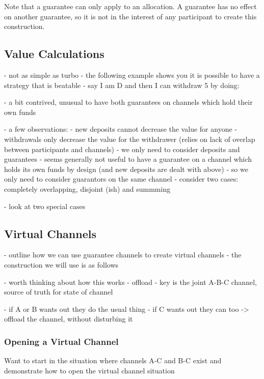 \documentclass{article}
\theoremstyle{definition}
\begin{document}
Note that a guarantee can only apply to an allocation. A guarantee has no effect on another guarantee, so it is not in the interest of any participant to create this construction.

\subsection{Value Calculations}

- not as simple as turbo
- the following example shows you it is possible to have a strategy that is beatable
- say I am D and then I can withdraw 5 by doing:

- a bit contrived, unusual to have both guarantees on channels which hold their own funds

- a few observations:
  - new deposits cannot decrease the value for anyone
  - withdrawals only decrease the value for the withdrawer (relies on lack of overlap between participants and channels)
  - we only need to consider deposits and guarantees
  - seems generally not useful to have a guarantee on a channel which holds its own funds by design
    (and new deposits are dealt with above)
  - so we only need to consider guarantors on the same channel
  - consider two cases: completely overlapping, disjoint (ish) and summming

  - look at two special cases

\subsection{Virtual Channels}

- outline how we can use guarantee channels to create virtual channels
- the construction we will use is as follows




- worth thinking about how this works
- offload
- key is the joint A-B-C channel, source of truth for state of channel

- if A or B wants out they do the usual thing
- if C wants out they can too -> offload the channel, without disturbing it

\subsubsection{Opening a Virtual Channel}

Want to start in the situation where channels A-C and B-C exist and demonstrate how to
open the virtual channel situation
\end{document}
